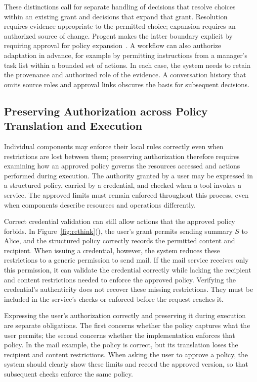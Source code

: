 These distinctions call for separate handling of decisions that resolve choices within an existing grant and decisions that expand that grant. Resolution requires evidence appropriate to the permitted choice; expansion requires an authorized source of change. Progent makes the latter boundary explicit by requiring approval for policy expansion~\cite{progent}. A workflow can also authorize adaptation in advance, for example by permitting instructions from a manager's task list within a bounded set of actions. In each case, the system needs to retain the provenance and authorized role of the evidence. A conversation history that omits source roles and approval links obscures the basis for subsequent decisions.

\subsection{Preserving Authorization across Policy Translation and Execution}\label{sec:rethink-representations}
Individual components may enforce their local rules correctly even when restrictions are lost between them; preserving authorization therefore requires examining how an approved policy governs the resources accessed and actions performed during execution. The authority granted by a user may be expressed in a structured policy, carried by a credential, and checked when a tool invokes a service. The approved limits must remain enforced throughout this process, even when components describe resources and operations differently.

Correct credential validation can still allow actions that the approved policy forbids. In Figure~\ref{fig:rethink}(), the user's grant permits sending summary $S$ to Alice, and the structured policy correctly records the permitted content and recipient. When issuing a credential, however, the system reduces these restrictions to a generic permission to send mail. If the mail service receives only this permission, it can validate the credential correctly while lacking the recipient and content restrictions needed to enforce the approved policy. Verifying the credential's authenticity does not recover these missing restrictions. They must be included in the service's checks or enforced before the request reaches it.

Expressing the user's authorization correctly and preserving it during execution are separate obligations. The first concerns whether the policy captures what the user permits; the second concerns whether the implementation enforces that policy. In the mail example, the policy is correct, but its translation loses the recipient and content restrictions. When asking the user to approve a policy, the system should clearly show these limits and record the approved version, so that subsequent checks enforce the same policy.

